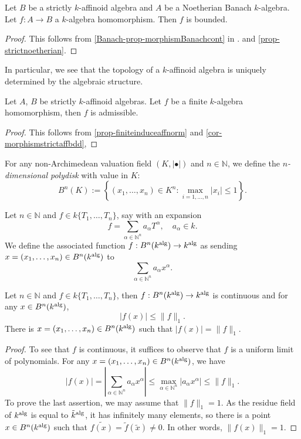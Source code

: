 \begin{corollary}\label{cor-morphismstrictaffbdd}
    Let $B$ be a strictly $k$-affinoid algebra and $A$ be a Noetherian Banach $k$-algebra. Let $f:A\rightarrow B$ a $k$-algebra homomorphism. Then $f$ is bounded.
\end{corollary}
\begin{proof}
    This follows from \cref{Banach-prop-morphismBanachcont} in . and \cref{prop-strictnoetherian}.
\end{proof}
In particular, we see that the topology of a $k$-affinoid algebra is uniquely determined by the algebraic structure.

\begin{corollary}\label{cor-finitehomoadmi}
    Let $A$, $B$ be strictly $k$-affinoid algebras. Let $f$ be a finite $k$-algebra homomorphism, then $f$ is admissible.
\end{corollary}
\begin{proof}
    This follows from \cref{prop-finiteinduceaffnorm} and \cref{cor-morphismstrictaffbdd},
\end{proof}
\begin{definition}
    For any non-Archimedean valuation field $(K,|\bullet|)$ and $n\in \mathbb{N}$, we define the \emph{$n$-dimensional polydisk} with value in $K$:
    \[
        B^n(K):=\left\{(x_1,\ldots,x_n)\in K^n: \max_{i=1,\ldots,n}|x_i|\leq 1\right\}.
    \]
\end{definition}

\begin{definition}
    Let $n\in \mathbb{N}$ and $f\in k\{T_1,\ldots,T_n\}$, say with an expansion
    \[
        f=\sum_{\alpha \in \mathbb{N}^n} a_{\alpha}T^{\alpha},\quad a_{\alpha}\in k.  
    \]
    We define the associated function $f:B^n(k^{\mathrm{alg}})\rightarrow k^{\mathrm{alg}}$ as sending $x=(x_1,\ldots,x_n)\in B^n(k^{\mathrm{alg}})$ to 
    \[
        \sum_{\alpha \in \mathbb{N}^n} a_{\alpha}x^{\alpha}.
    \]
\end{definition}


\begin{lemma}\label{lma-finducecontfunction}
    Let $n\in \mathbb{N}$ and $f\in k\{T_1,\ldots,T_n\}$, then $f:B^n(k^{\mathrm{alg}})\rightarrow k^{\mathrm{alg}}$ is continuous and for any $x\in B^n(k^{\mathrm{alg}})$,
    \[
        |f(x)|\leq \|f\|_1.
    \]
    There is $x=(x_1,\ldots,x_n)\in B^n(k^{\mathrm{alg}})$ such that $|f(x)|=\|f\|_1$.
\end{lemma}
\begin{proof}
    To see that $f$ is continuous, it suffices to observe that $f$ is a uniform limit of polynomials. For any $x=(x_1,\ldots,x_n)\in B^n(k^{\mathrm{alg}})$, we have
    \[
        |f(x)|  =\left|\sum_{\alpha \in \mathbb{N}^n} a_{\alpha}x^{\alpha}\right|\leq \max_{\alpha \in \mathbb{N}^n} |a_{\alpha}x^{\alpha}|\leq \|f\|_1.
    \]
    To prove the last assertion, we may assume that $\|f\|_1=1$. As the residue field of $k^{\mathrm{alg}}$ is equal to $\tilde{k}^{\mathrm{alg}}$, it has infinitely many elements, so there is a point $x\in B^n(k^{\mathrm{alg}})$ such that $\widetilde{f(x)}=\tilde{f}(\tilde{x})\neq 0$. In other words, $\|f(x)\|_1=1$.
\end{proof}


